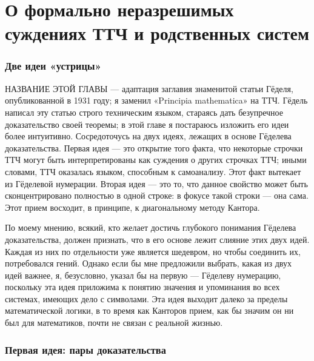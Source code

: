 \documentclass[../main.tex]{subfiles}
\begin{document}
\def\ChapterName{О формально неразрешимых суждениях ТТЧ и родственных систем}
\chapter[\ChapterName]{\ChapterName\footnotemark}

\subsection{Две идеи «устрицы»}

НАЗВАНИЕ ЭТОЙ ГЛАВЫ --- адаптация заглавия знаменитой статьи Гёделя, опубликованной в 1931 году; я заменил «Principia mathematica» на ТТЧ\@. Гёдель написал эту статью строго техническим языком, стараясь дать безупречное доказательство своей теоремы; в этой главе я постараюсь изложить его идеи более интуитивно. Сосредоточусь на двух идеях, лежащих в основе Гёделева доказательства. Первая идея --- это открытие того факта, что некоторые строчки ТТЧ могут быть интерпретированы как суждения о других строчках ТТЧ; иными словами, ТТЧ оказалась языком, способным к самоанализу. Этот факт вытекает из Гёделевой нумерации. Вторая идея --- это то, что данное свойство может быть сконцентрировано полностью в одной строке: в фокусе такой строки --- она сама. Этот прием восходит, в принципе, к диагональному методу Кантора.

По моему мнению, всякий, кто желает достичь глубокого понимания Гёделева доказательства, должен признать, что в его основе лежит слияние этих двух идей. Каждая из них по отдельности уже является шедевром, но чтобы соединить их, потребовался гений. Однако если бы мне предложили выбрать, какая из двух идей важнее, я, безусловно, указал бы на первую --- Гёделеву нумерацию, поскольку эта идея приложима к понятию значения и упоминания во всех системах, имеющих дело с символами. Эта идея выходит далеко за пределы математической логики, в то время как Канторов прием, как бы значим он ни был для математиков, почти не связан с реальной жизнью.


\subsection{Первая идея: пары доказательства}
\end{document}

